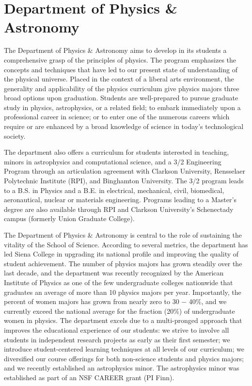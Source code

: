 \documentclass[11pt, preprint]{aastex}
\begin{document}
\section{Department of Physics \& Astronomy}
The Department of Physics \& Astronomy aims to develop in its students a
comprehensive grasp of the principles of physics. The program emphasizes the
concepts and techniques that have led to our present state of understanding of
the physical universe. Placed in the context of a liberal arts environment, the
generality and applicability of the physics curriculum give physics majors three
broad options upon graduation. Students are well-prepared to pursue graduate
study in physics, astrophysics, or a related field; to embark immediately upon a
professional career in science; or to enter one of the numerous careers which
require or are enhanced by a broad knowledge of science in today's technological
society.
					
The department also offers a curriculum for students interested in teaching,
minors in astrophysics and computational science, and a 3/2 Engineering Program
through an articulation agreement with Clarkson University, Rensselaer
Polytechnic Institute (RPI), and Binghamton University.  The 3/2 program leads
to a B.S. in Physics and a B.E. in electrical, mechanical, civil, biomedical,
aeronautical, nuclear or materials engineering.  Programs leading to a Master’s
degree are also available through RPI and Clarkson University's
Schenectady campus (formerly Union Graduate College).  %



The Department of Physics \& Astronomy is central to the role of
sustaining the vitality of the School of Science. According to several metrics, the department has
led Siena College in upgrading its national profile and improving the
quality of student achievement. The number of physics majors has grown
steadily over the last decade, and the department was recently
recognized by the American Institute of Physics as one of the few
undergraduate colleges nationwide that graduates an average of more
than 10 physics majors per year. Importantly, the percent of women
majors has grown from nearly zero to 30 − 40\%, and we currently exceed
the national average for the fraction (20\%) of undergraduate women in
 physics. The department excels due to a multi-pronged approach that
 improves the educational experience of our students: we strive to
 involve all students in independent research projects as early as their
 first semester; we introduce student-centered learning techniques at all levels of our curriculum; we
 diversified our course offerings for both non-science students and
 physics majors; and we recently established an astrophysics minor.
The astrophysics minor was established as part of an NSF CAREER grant
(PI Finn).
		
\end{document}
